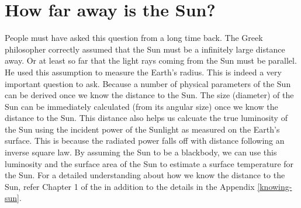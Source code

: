 \documentclass{../template/texnote}
\begin{document}


\section{How far away is the Sun?}
People must have asked this question from a long time back.
The Greek philosopher correctly assumed that the Sun must be a infinitely large distance away. Or at least so far that the light rays coming from the Sun must be parallel.
He used this assumption to measure the Earth's radius.
This is indeed a very important question to ask. Because a number of physical parameters of the Sun can be derived once we know the distance to the Sun.
The size (diameter) of the Sun can be immediately calculated (from its angular size) once we know the distance to the Sun.
This distance also helps us calcuate the true luminosity of the Sun using the incident power of the Sunlight as measured on the Earth's surface.
This is because the radiated power falls off with distance following an inverse square law.
By assuming the Sun to be a blackbody, we can use this luminosity and the surface area of the Sun to estimate a surface temperature for the Sun.
For a detailed understanding about how we know the distance to the Sun, refer Chapter 1 of the  in addition to the details in the Appendix \ref{knowing-sun}.

\end{document}

